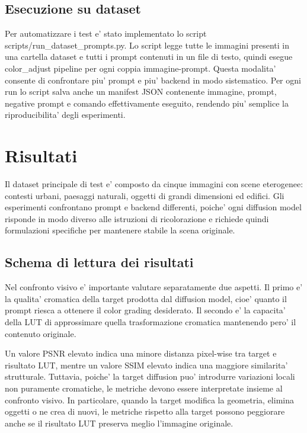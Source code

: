 \documentclass[12pt,a4paper]{report}
\renewcommand{\texttt}[1]{{\normalfont #1}}
\begin{document}
\section{Esecuzione su dataset}

Per automatizzare i test e' stato implementato lo script \texttt{scripts/run\_dataset\_prompts.py}. Lo script legge tutte le immagini presenti in una cartella dataset e tutti i prompt contenuti in un file di testo, quindi esegue \texttt{color\_adjust pipeline} per ogni coppia immagine-prompt.
Questa modalita' consente di confrontare piu' prompt e piu' backend in modo sistematico. Per ogni run lo script salva anche un manifest JSON contenente immagine, prompt, negative prompt e comando effettivamente eseguito, rendendo piu' semplice la riproducibilita' degli esperimenti.

\chapter{Risultati}

Il dataset principale di test e' composto da cinque immagini con scene eterogenee: contesti urbani, paesaggi naturali, oggetti di grandi dimensioni ed edifici. Gli esperimenti confrontano prompt e backend differenti, poiche' ogni diffusion model risponde in modo diverso alle istruzioni di ricolorazione e richiede quindi formulazioni specifiche per mantenere stabile la scena originale.

\section{Schema di lettura dei risultati}

Nel confronto visivo e' importante valutare separatamente due aspetti. Il primo e' la qualita' cromatica della target prodotta dal diffusion model, cioe' quanto il prompt riesca a ottenere il color grading desiderato. Il secondo e' la capacita' della LUT di approssimare quella trasformazione cromatica mantenendo pero' il contenuto originale.

Un valore PSNR elevato indica una minore distanza pixel-wise tra target e risultato LUT, mentre un valore SSIM elevato indica una maggiore similarita' strutturale. Tuttavia, poiche' la target diffusion puo' introdurre variazioni locali non puramente cromatiche, le metriche devono essere interpretate insieme al confronto visivo. In particolare, quando la target modifica la geometria, elimina oggetti o ne crea di nuovi, le metriche rispetto alla target possono peggiorare anche se il risultato LUT preserva meglio l'immagine originale.
\end{document}
